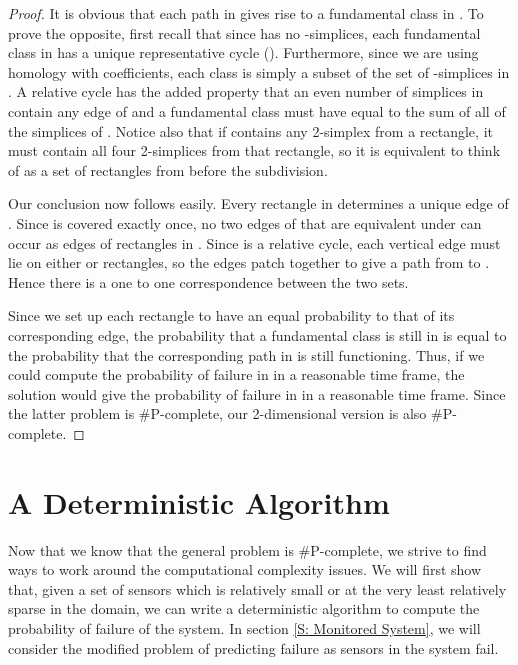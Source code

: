\documentclass[10pt,twocolumn]{article} \usepackage{amsmath,epsf,amssymb,cite,pifont,amsthm, mathrsfs,epsfig,  bbm, amsthm,  setspace}
\renewcommand{\1}{\mathbbm{1}}
\begin{document}
\begin{proof}
It is obvious that each path in  gives rise to a fundamental class in .
To prove the opposite, first recall that since  has no -simplices, each fundamental
class in  has a unique representative cycle ().
Furthermore, since we are using homology with  coefficients,
each class is simply a subset of the set of -simplices in .
A relative cycle  has the added property that an even number of
 simplices in  contain any edge of 
and a fundamental class must have  equal to the sum of all of
the simplices of .
Notice also that if  contains any  2-simplex from a rectangle, it must contain all
four 2-simplices from that rectangle,
so it is equivalent to think of  as a set of rectangles from before the subdivision.

Our conclusion now follows easily.
Every rectangle in  determines a unique edge of .
Since  is covered exactly once, no two edges of  that
are equivalent under  can occur as edges of rectangles in .
Since  is a relative cycle, each vertical edge must lie on either
 or  rectangles, so the edges patch together to give a path from
 to .
Hence there is a one to one correspondence between the two sets.

Since we set up each rectangle to have an equal probability to that of its corresponding edge,
the probability that a fundamental class is still in  is equal to the probability that
the corresponding path in  is still functioning.
Thus, if we could compute the probability of failure in  in a reasonable time frame, the solution would
give the probability of failure in  in a reasonable time frame.
Since the latter problem is \#P-complete, our 2-dimensional version is also \#P-complete.

\end{proof}


\section{A Deterministic Algorithm}\label{S: Deterministic Algorithm}

Now that we know that the general problem is \#P-complete,
we strive to find ways to work around the computational complexity issues.
We will first show that, given a set of sensors which is relatively small
or at the very least relatively sparse in the domain, we can write a deterministic
algorithm to compute the probability of failure of the system.
In section \ref{S: Monitored System}, we will  consider the modified
problem of predicting failure as sensors in the system fail.
\end{document}
